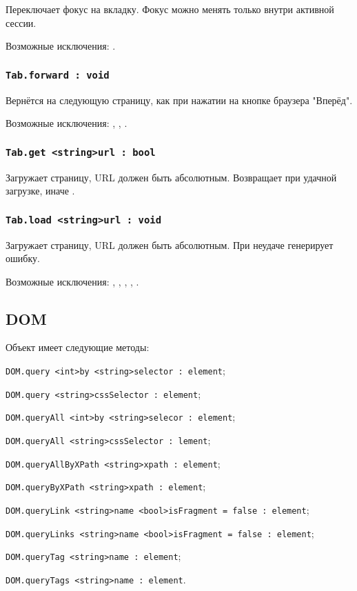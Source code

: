 Переключает фокус на вкладку. Фокус можно менять только внутри активной сессии.

Возможные исключения: .

\subsubsection{\lstinline|Tab.forward : void|}

Вернётся на следующую страницу, как при нажатии на кнопке браузера "Вперёд".

Возможные исключения: , , .

\subsubsection{\lstinline|Tab.get <string>url : bool|}

Загружает страницу, URL должен быть абсолютным. Возвращает \true{} при удачной загрузке, иначе \false.

\subsubsection{\lstinline|Tab.load <string>url : void|}

Загружает страницу, URL должен быть абсолютным. При неудаче генерирует ошибку.

Возможные исключения: , , , , .

\subsection{{\color{orange} DOM}}

Объект \dom{} имеет следующие методы:
\begin{icItems}
	\item \lstinline|DOM.query <int>by <string>selector : element|;
	\item \lstinline|DOM.query <string>cssSelector : element|;
	\item \lstinline|DOM.queryAll <int>by <string>selecor : element|;
	\item \lstinline|DOM.queryAll <string>cssSelector : lement|;
	\item \lstinline|DOM.queryAllByXPath <string>xpath : element|;
	\item \lstinline|DOM.queryByXPath <string>xpath : element|;
	\item \lstinline|DOM.queryLink <string>name <bool>isFragment = false : element|;
	\item \lstinline|DOM.queryLinks <string>name <bool>isFragment = false : element|;
	\item \lstinline|DOM.queryTag <string>name : element|;
	\item \lstinline|DOM.queryTags <string>name : element|.
\end{icItems}

